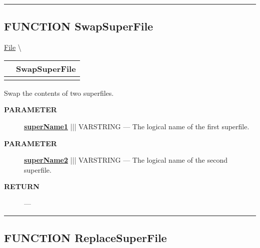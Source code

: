 \rule{\linewidth}{0.5pt}
\subsection*{\textsf{\colorbox{headtoc}{\color{white} FUNCTION}
SwapSuperFile}}

\hypertarget{ecldoc:file.swapsuperfile}{}
\hspace{0pt} \hyperlink{ecldoc:File}{File} \textbackslash 

{\renewcommand{\arraystretch}{1.5}
\begin{tabularx}{\textwidth}{|>{\raggedright\arraybackslash}l|X|}
\hline
\hspace{0pt}\mytexttt{\color{red} } & \textbf{SwapSuperFile} \\
\hline
\multicolumn{2}{|>{\raggedright\arraybackslash}X|}{\hspace{0pt}\mytexttt{\color{param} (varstring superName1, varstring superName2)}} \\
\hline
\end{tabularx}
}

\par





Swap the contents of two superfiles.






\par
\begin{description}
\item [\colorbox{tagtype}{\color{white} \textbf{\textsf{PARAMETER}}}] \textbf{\underline{superName1}} ||| VARSTRING --- The logical name of the first superfile.
\item [\colorbox{tagtype}{\color{white} \textbf{\textsf{PARAMETER}}}] \textbf{\underline{superName2}} ||| VARSTRING --- The logical name of the second superfile.
\end{description}







\par
\begin{description}
\item [\colorbox{tagtype}{\color{white} \textbf{\textsf{RETURN}}}] \textbf{} --- 
\end{description}




\rule{\linewidth}{0.5pt}
\subsection*{\textsf{\colorbox{headtoc}{\color{white} FUNCTION}
ReplaceSuperFile}}

